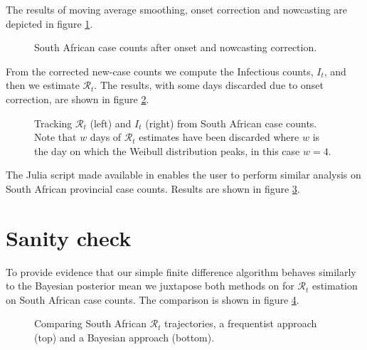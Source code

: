 \documentclass[11pt]{article}
\begin{document}
The results of moving average smoothing, onset correction and nowcasting 
are depicted in figure \ref{fig_onset_now_za}.

\begin{figure}[H]
\begin{center}
\end{center}
\caption{South African case counts after onset and nowcasting correction.}  
\label{fig_onset_now_za}
\end{figure}

From the corrected new-case counts we compute the Infectious counts, $I_t$,
and then we estimate $\mathcal{R}_t$. The results, with some days discarded due
to onset correction, are shown in figure \ref{fig_rt_inf_za}.

\begin{figure}[H]
\begin{center}
\end{center}
\caption{Tracking $\mathcal{R}_t$ (left) and $I_t$ (right) from South African case counts.
Note that $w$ days of $\mathcal{R}_t$ estimates have been discarded where $w$ is
the day on which the Weibull distribution peaks, in this case $w=4$.}  
\label{fig_rt_inf_za}
\end{figure}

The Julia script made available in \cite{murrell} enables the user to perform similar
analysis on South African provincial case counts. Results are shown in figure \ref{fig_rt_inf_prov}.

\begin{figure}[H]
\begin{center}
\end{center}
\label{fig_rt_inf_prov}
\end{figure}

\section{Sanity check}

To provide evidence that our simple finite difference algorithm behaves
similarly to the Bayesian posterior mean we  juxtapose both methods on
for $\mathcal{R}_t$ estimation on
South African case counts. The comparison is shown in figure \ref{fig_comp}.

\begin{figure}[H]
\begin{center}
\end{center}
\caption{Comparing South African $\mathcal{R}_t$ trajectories, a frequentist approach (top)
and a Bayesian approach (bottom).}
\label{fig_comp}
\end{figure}
\end{document}
